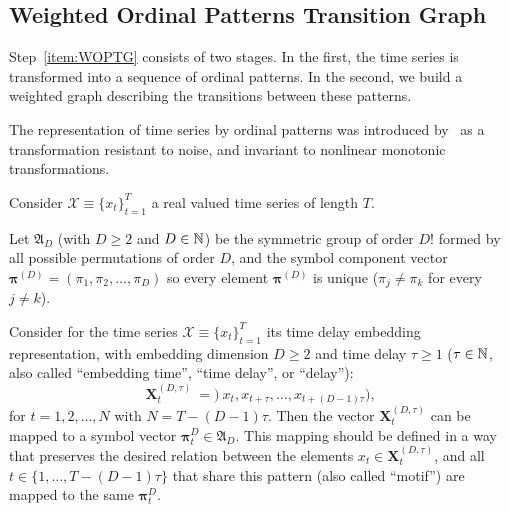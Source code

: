 \documentclass[paper=letter, fontsize=12pt]{article}
\begin{document}
	\subsection{Weighted Ordinal Patterns Transition Graph}\label{WATG}
	
	Step~\ref{item:WOPTG} consists of two stages.
	In the first, the time series is transformed into a sequence of ordinal patterns.
	In the second, we build a weighted graph describing the transitions between these patterns.
	
	The representation of time series by ordinal patterns was introduced by~\cite{Bandt2002Permutation} as a transformation resistant to noise, and invariant to nonlinear monotonic transformations.
	
	Consider ${\mathcal X} \equiv \{x_t\}_{t=1}^{T}$ a real valued time series of length $T$. 
	
	Let ${\mathfrak A}_{D}$ (with $D \geq 2$ and $D \in {\Bbb N}$) be the symmetric group of order $D!$ formed by all 
	possible permutations of order $D$, and the symbol component vector 
	${\bm \pi}^{(D)} = (\pi_1, \pi_2, \dots, \pi_D)$ so every element ${\bm \pi}^{(D)}$ is unique 
	($\pi_j \neq \pi_k$ for every $j \neq k$). 
	
	Consider for the time series ${\mathcal X} \equiv \{x_t\}_{t=1}^{T}$ its time delay embedding representation,
	with embedding dimension $D \geq 2$ and time delay $\tau \geq 1$ ($\tau \in {\Bbb N}$, also called ``embedding time'', ``time delay'', or ``delay''):
	\begin{equation} 
	\label{eq:time-delay}
	{\mathbf X}^{(D,\tau)}_t ~=)~ x_t,x_{t+\tau},\dots,x_{t+(D-1)\tau} ) ,
	\end{equation} 
	for $t = 1,2,\dots,N$ with $N = T-(D-1) \tau$.
	Then the vector ${\mathbf X}^{(D,\tau)}_t$ can be mapped to a symbol vector ${\bm \pi}_t^D \in {\mathfrak A}_{D}$. 
	This mapping should be defined in a way that preserves the desired relation between the elements 
	$x_t  \in {\mathbf X}^{(D,\tau)}_t$, and all $t \in \{1,\dots,T-(D-1)\tau\}$ that share this pattern (also called ``motif'') are mapped to the same 
	${\bm \pi}_t^{D}$.
	
\end{document}
